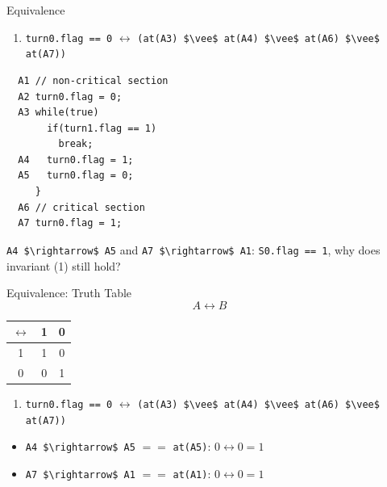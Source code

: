 \begin{frame}[fragile]{Equivalence}
  \begin{enumerate}
  \item \lstinline!turn0.flag == 0! $\leftrightarrow$ 
    \lstinline!(at(A3) $\vee$ at(A4) $\vee$ at(A6) $\vee$ at(A7))!
  \end{enumerate}


\begin{lstlisting}
  A1 // non-critical section
  A2 turn0.flag = 0;
  A3 while(true)
       if(turn1.flag == 1) 
         break;
  A4   turn0.flag = 1;
  A5   turn0.flag = 0;
     }
  A6 // critical section
  A7 turn0.flag = 1;
\end{lstlisting}


  \lstinline!A4 $\rightarrow$ A5! and \lstinline!A7 $\rightarrow$ A1!:
  \lstinline!S0.flag == 1!, why does invariant (1) still hold?
\end{frame}

\begin{frame}{Equivalence: Truth Table}
  $$A \leftrightarrow B$$


  \begin{center}
    \begin{tabular}{|c|c c|}
      \hline
      $\leftrightarrow$ & 1 & 0 \\\hline
      1 & 1 & 0 \\
      0 & 0 & 1 \\\hline
    \end{tabular}
  \end{center}


  \begin{enumerate}
  \item \lstinline!turn0.flag == 0! $\leftrightarrow$ 
    \lstinline!(at(A3) $\vee$ at(A4) $\vee$ at(A6) $\vee$ at(A7))!
  \end{enumerate}


  \begin{itemize}  
  \item \lstinline!A4 $\rightarrow$ A5! $==$ \lstinline!at(A5)!: $0
    \leftrightarrow 0 = 1$
  \item \lstinline!A7 $\rightarrow$ A1! $==$ \lstinline!at(A1)!: $0
    \leftrightarrow 0 = 1$
  \end{itemize}
\end{frame}


